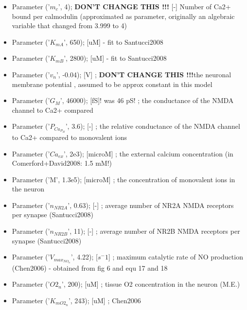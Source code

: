 \documentclass[fleqn]{report}
\numberwithin{equation}{section}
\numberwithin{equation}{section}
\begin{document}
\begin{itemize}
    \item Parameter  ('$m_c$', 4);     \textbf{DON'T CHANGE THIS !!!} [-] Number of Ca2+ bound per calmodulin (approximated as parameter, originally an algebraic variable that changed from 3.999 to 4)\\
    \item Parameter  ('$K_{mA}$', 650);           [uM] - fit to Santucci2008\\
    \item Parameter ('$K_{mB}$', 2800);          [uM] - fit to Santucci2008\\
    \item Parameter  ('$v_n$', -0.04);           [V] ; \textbf{DON'T CHANGE THIS !!!}the neuronal membrane potential , assumed to be approx constant in this model\\
    \item Parameter  ('$G_M$', 46000);          [fS]! was 46 pS! ; the conductance of the NMDA channel to Ca2+ compared  \\
    \item Parameter  ('$P_{Ca_{P_{M}}}$', 3.6);        [-] ; the relative conductance of the NMDA channel to Ca2+ compared to monovalent ions\\
    \item Parameter  ('$Ca_{ex}$', 2e3);           [microM] ; the external calcium concentration (in Comerford+David2008: 1.5 mM!)\\
    \item Parameter  ('M', 1.3e5);             [microM] ; the concentration of monovalent ions in the neuron\\
    \item Parameter  ('$n_{NR2A}$', 0.63);         [-] ; average number of NR2A NMDA receptors per synapse (Santucci2008)\\
    \item Parameter  ('$n_{NR2B}$', 11);          [-] ; average number of NR2B NMDA receptors per synapse (Santucci2008)\\
    \item Parameter  ('$V_{max_{NO_{n}}}$', 4.22);     [$s^-1$] ; maximum catalytic rate of NO production (Chen2006) - obtained from fig 6 and equ 17 and 18\\
    \item Parameter  ('$O2_n$', 200);            [uM] ; tissue O2 concentration in the neuron (M.E.)\\
    \item Parameter  ('$K_{mO2_{n}}$', 243);         [uM] ; Chen2006\\

\end{itemize}
\end{document}
